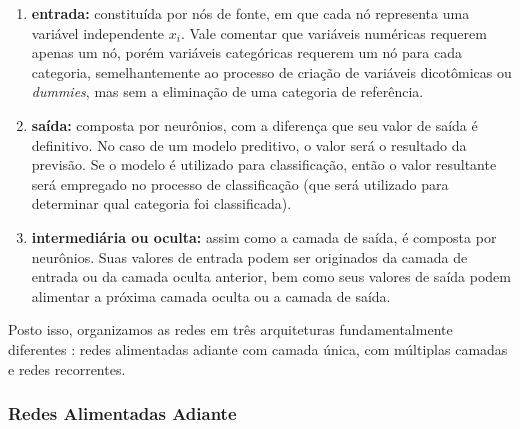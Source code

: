 \documentclass{automatextcc}
\newcommand{\bs}[1]{\boldsymbol{#1}}
\begin{document}
\begin{enumerate}
    \item \textbf{entrada:} constituída por nós de fonte, em que cada nó representa uma variável independente $x_i$. Vale comentar que variáveis numéricas requerem apenas um nó, porém variáveis categóricas requerem um nó para cada categoria, semelhantemente ao processo de criação de variáveis dicotômicas ou \textit{dummies}, mas sem a eliminação de uma categoria de referência.
    \item \textbf{saída:} composta por neurônios, com a diferença que seu valor de saída é definitivo. No caso de um modelo preditivo, o valor será o resultado da previsão. Se o modelo é utilizado para classificação, então o valor resultante será empregado no processo de classificação (que será utilizado para determinar qual categoria foi classificada).
    \item \textbf{intermediária ou oculta:} assim como a camada de saída, é composta por neurônios. Suas valores de entrada podem ser originados da camada de entrada ou da camada oculta anterior, bem como seus valores de saída podem alimentar a próxima camada oculta ou a camada de saída.
\end{enumerate}
Posto isso, organizamos as redes em três arquiteturas fundamentalmente diferentes \citep{hair2005,haykin2008,hagan2014}: redes alimentadas adiante com camada única, com múltiplas camadas e redes recorrentes.


\subsubsection{Redes Alimentadas Adiante}


\end{document}
